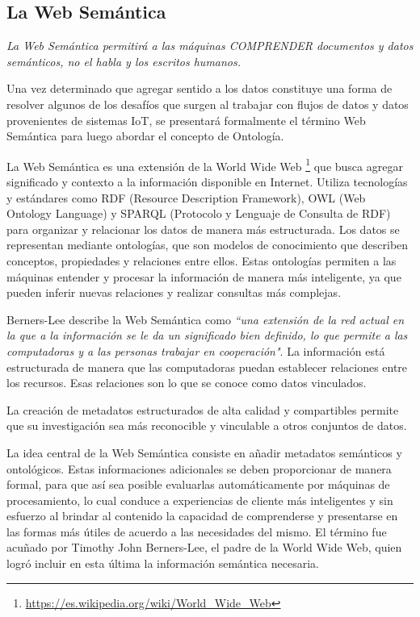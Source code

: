\documentclass[12pt]{article}
\begin{document}
    
\subsection{La Web Sem\'antica} 
\label{ch}

\textit{La Web Semántica permitirá a las máquinas COMPRENDER documentos y datos semánticos, no el habla y los escritos humanos. \citep{ref10} } 

Una vez determinado que agregar sentido a los datos constituye una forma de resolver algunos de los desafíos que surgen al trabajar con flujos de datos y datos provenientes de sistemas IoT, se presentará formalmente el término Web Semántica para luego abordar el concepto de Ontología.

La Web Semántica es una extensión de la World Wide Web \footnote{\href{{https://es.wikipedia.org/wiki/World_Wide_Web}}{\url{https://es.wikipedia.org/wiki/World_Wide_Web}}} que busca agregar significado y contexto a la información disponible en Internet. Utiliza tecnologías y estándares como RDF (Resource Description Framework), OWL (Web Ontology Language) y SPARQL (Protocolo y Lenguaje de Consulta de RDF) para organizar y relacionar los datos de manera más estructurada. Los datos se representan mediante ontologías, que son modelos de conocimiento que describen conceptos, propiedades y relaciones entre ellos. Estas ontologías permiten a las máquinas entender y procesar la información de manera más inteligente, ya que pueden inferir nuevas relaciones y realizar consultas más complejas.

Berners-Lee describe la Web Semántica como \textit{“una extensión de la red actual en la que a la información se le da un significado bien definido, lo que permite a las computadoras y a las personas trabajar en cooperación"}\citep{ref10}. La información está estructurada de manera que las computadoras puedan establecer relaciones entre los recursos. Esas relaciones son lo que se conoce como datos vinculados.

La creación de metadatos estructurados de alta calidad y compartibles permite que su investigación sea más reconocible y vinculable a otros conjuntos de datos.

La idea central de la Web Semántica consiste en añadir metadatos semánticos y ontológicos. Estas informaciones adicionales se deben proporcionar de manera formal, para que así sea posible evaluarlas automáticamente por máquinas de procesamiento, lo cual conduce a experiencias de cliente más inteligentes y sin esfuerzo al brindar al contenido la capacidad de comprenderse y presentarse en las formas más útiles de acuerdo a las necesidades del mismo. El término fue acuñado por Timothy John Berners-Lee, el padre de la World Wide Web, quien logró incluir en esta última la información semántica necesaria. \citep{ref19}
\end{document}
